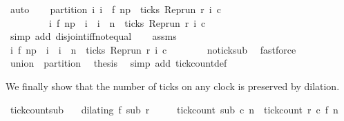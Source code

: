 \begin{isabellebody}
\ auto\isanewline
\ \ \isamarkupfalse%
\ partition{\isacharcolon}\ {\isacartoucheopen}{\isacharbraceleft}i{\isachardot}\ i\ {\isasymle}\ f\ n\isactrlsub p\ {\isasymand}\ ticks\ {\isacharparenleft}{\isacharparenleft}Rep{\isacharunderscore}run\ r{\isacharparenright}\ i\ c{\isacharparenright}{\isacharbraceright}\isanewline
\ \ \ \ \ \ \ \ {\isasyminter}\ {\isacharbraceleft}i{\isachardot}\ f\ n\isactrlsub p\ {\isacharless}\ i\ {\isasymand}\ i\ {\isasymle}\ n\ {\isasymand}\ ticks\ {\isacharparenleft}{\isacharparenleft}Rep{\isacharunderscore}run\ r{\isacharparenright}\ i\ c{\isacharparenright}{\isacharbraceright}\ {\isacharequal}\ {\isacharbraceleft}{\isacharbraceright}{\isacartoucheclose}\isanewline
\ \ \ \ \isamarkupfalse%
\ {\isacharparenleft}simp\ add{\isacharcolon}\ disjoint{\isacharunderscore}iff{\isacharunderscore}not{\isacharunderscore}equal{\isacharparenright}\isanewline
\ \ \isamarkupfalse%
\ assms\ \isamarkupfalse%
\ {\isacartoucheopen}{\isacharbraceleft}i{\isachardot}\ f\ n\isactrlsub p\ {\isacharless}\ i\ {\isasymand}\ i\ {\isasymle}\ n\ {\isasymand}\ ticks\ {\isacharparenleft}{\isacharparenleft}Rep{\isacharunderscore}run\ r{\isacharparenright}\ i\ c{\isacharparenright}{\isacharbraceright}\ {\isacharequal}\ {\isacharbraceleft}{\isacharbraceright}{\isacartoucheclose}\isanewline
\ \ \ \ \isamarkupfalse%
\ no{\isacharunderscore}tick{\isacharunderscore}sub\ \isamarkupfalse%
\ fastforce\isanewline
\ \ \isamarkupfalse%
\ union\ \ partition\ \isamarkupfalse%
\ {\isacharquery}thesis\ \isamarkupfalse%
\ {\isacharparenleft}simp\ add{\isacharcolon}\ tick{\isacharunderscore}count{\isacharunderscore}def{\isacharparenright}\isanewline
{}\isamarkupfalse%
%
\endisatagproof
{\isafoldproof}%
%
\isadelimproof
%
\endisadelimproof
%
\begin{isamarkuptext}%
We finally show that the number of ticks on any clock is preserved by dilation.%
\end{isamarkuptext}\isamarkuptrue%
\isamarkupfalse%
\ tick{\isacharunderscore}count{\isacharunderscore}sub{\isacharcolon}\isanewline
\ \ \ {\isacartoucheopen}dilating\ f\ sub\ r{\isacartoucheclose}\isanewline
\ \ \ \ \ {\isacartoucheopen}tick{\isacharunderscore}count\ sub\ c\ n\ {\isacharequal}\ tick{\isacharunderscore}count\ r\ c\ {\isacharparenleft}f\ n{\isacharparenright}{\isacartoucheclose}\isanewline
%
\isadelimproof
%
\endisadelimproof

\end{isabellebody}
